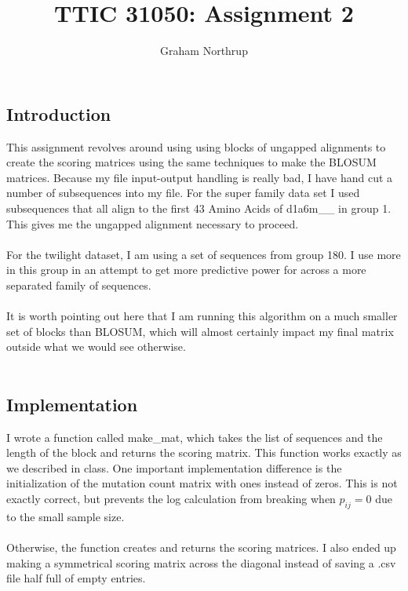 \documentclass[12pt]{article}
\begin{document}
 
 
\title{TTIC 31050: Assignment 2}
\author{Graham Northrup}
\maketitle

\subsection{Introduction}
This assignment revolves around using using blocks of ungapped alignments to create the scoring matrices using the same techniques to make the BLOSUM matrices. Because my file input-output handling is really bad, I have hand cut a number of subsequences into my file. For the super family data set I used subsequences that all align to the first 43 Amino Acids of d1a6m\_\_ in group 1. This gives me the ungapped alignment necessary to proceed. \\ \\
For the twilight dataset, I am using a set of sequences from group 180. I use more in this group in an attempt to get more predictive power for across a more separated family of sequences.\\ \\
It is worth pointing out here that I am running this algorithm on a much smaller set of blocks than BLOSUM, which will almost certainly impact my final matrix outside what we would see otherwise. \\ \\


\subsection{Implementation}
I wrote a function called make\_mat, which takes the list of sequences and the length of the block and returns the scoring matrix. This function works exactly as we described in class. One important implementation difference is the initialization of the mutation count matrix with ones instead of zeros. This is not exactly correct, but prevents the log calculation from breaking when $p_{ij} = 0$ due to the small sample size. \\ \\
Otherwise, the function creates and returns the scoring matrices. I also ended up making a symmetrical scoring matrix across the diagonal instead of saving a .csv file half full of empty entries.
\end{document}
